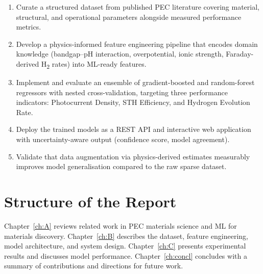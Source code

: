 \begin{enumerate}
  \item Curate a structured dataset from published PEC literature covering
        material, structural, and operational parameters alongside measured
        performance metrics.
  \item Develop a physics-informed feature engineering pipeline that encodes
        domain knowledge (bandgap--pH interaction, overpotential, ionic
        strength, Faraday-derived H\textsubscript{2} rates) into ML-ready
        features.
  \item Implement and evaluate an ensemble of gradient-boosted and
        random-forest regressors with nested cross-validation, targeting
        three performance indicators: Photocurrent Density, STH Efficiency,
        and Hydrogen Evolution Rate.
  \item Deploy the trained models as a REST API and interactive web
        application with uncertainty-aware output (confidence score,
        model agreement).
  \item Validate that data augmentation via physics-derived estimates
        measurably improves model generalisation compared to the raw sparse
        dataset.
\end{enumerate}

\section{Structure of the Report}

Chapter~\ref{ch:A} reviews related work in PEC materials science and ML
for materials discovery.
Chapter~\ref{ch:B} describes the dataset, feature engineering, model
architecture, and system design.
Chapter~\ref{ch:C} presents experimental results and discusses model
performance.
Chapter~\ref{ch:concl} concludes with a summary of contributions and
directions for future work.
